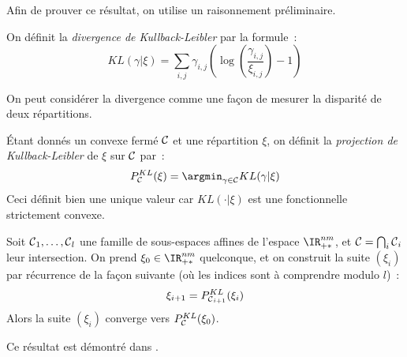 Afin de prouver ce résultat, on utilise un raisonnement préliminaire.
\begin{definition}
On définit la \emph{divergence de Kullback-Leibler} par la formule~:
\begin{equation}\label{eq:kl}
KL(\gamma | \xi) = \sum_{i,j} \gamma_{i,j} \left(\log\left(\frac{\gamma_{i,j}}{\xi_{i,j}} \right) -1 \right)
\end{equation}
\end{definition}
On peut considérer la divergence comme une façon de mesurer la disparité de deux répartitions.
\begin{definition}
 \'Etant donnés un convexe fermé $\operatorname{\mathcal{C}}$ et une répartition $\xi$, on définit la \emph{projection de Kullback-Leibler} de $\xi$ sur $\operatorname{\mathcal{C}}$ par~:
\begin{equation}\label{eq:pkl}
P^{KL}_{\Ccal} (\xi) = \argmin_{\gamma \in \Ccal} KL(\gamma | \xi)
\end{equation}
Ceci définit bien une unique valeur car $KL(\cdot | \xi)$ est une fonctionnelle strictement convexe.
\end{definition}


\begin{lemma}\label{lemma:bregman}
Soit $\operatorname{\mathcal{C}}_1, \ldots, \operatorname{\mathcal{C}}_l$ une famille de sous-espaces affines de l'espace $\IR_{+*}^{nm}$, et $\operatorname{\mathcal{C}} = \bigcap_i \operatorname{\mathcal{C}}_i$ leur intersection. On prend $\xi_0 \in \IR_{+*}^{nm}$ quelconque, et on construit la suite $(\xi_i)$ par récurrence de la façon suivante (où les indices sont à comprendre modulo $l$)~:
\[
\xi_{i+1} = P^{KL}_{\operatorname{\mathcal{C}}_{i+1}}(\xi_i)
\]
Alors la suite $(\xi_i)$ converge vers $P^{KL}_{\operatorname{\mathcal{C}}} (\xi_0)$. 
\end{lemma}
Ce résultat est démontré dans \cite{bregman66}.

